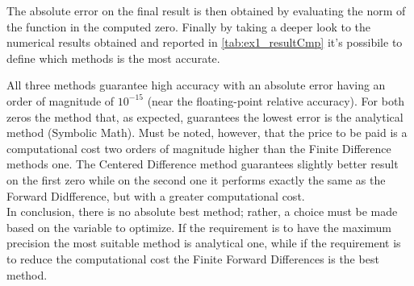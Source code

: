 \documentclass[11pt,a4paper,oneside]{article}
\begin{document}
The absolute error on the final result is then obtained by evaluating the norm of the function in the computed zero. 
Finally by taking a deeper look to the numerical results obtained and reported in \cref{tab:ex1_resultCmp} it's possibile to define which methods is the most accurate.

\begin{table}[ht]
    \centering
    \hspace{0.05\linewidth}     %
    \caption{Methods compare on zeros computation}
    \label{tab:ex1_resultCmp}
\end{table}

All three methods guarantee high accuracy with an absolute error having an order of magnitude of $10^{-15}$ (near the floating-point relative accuracy).
For both zeros the method that, as expected, guarantees the lowest error is the analytical method (Symbolic Math).
Must be noted, however, that the price to be paid is a computational cost two orders of magnitude higher than the Finite Difference methods one.
The Centered Difference method guarantees slightly better result on the first zero while on the second one it performs exactly the same as the Forward Didfference, but with a greater computational cost.
\\
In conclusion, there is no absolute best method; rather, a choice must be made based on the variable to optimize.
If the requirement is to have the maximum precision the most suitable method is analytical one, while if the requirement is to reduce the computational cost the Finite Forward Differences is the best method.
\end{document}
